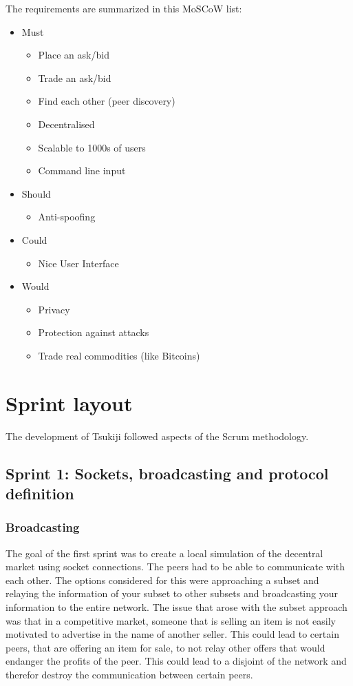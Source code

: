 \documentclass[]{article}
\newenvironment{myitemize}
{ \begin{itemize}
    \setlength{\itemsep}{0pt}
    \setlength{\parskip}{0pt}
    \setlength{\parsep}{0pt}     }
{ \end{itemize}                  }
\begin{document}
The requirements are summarized in this MoSCoW list: \\

\begin{myitemize}
\item Must
\begin{myitemize}
	\item Place an ask/bid
	\item Trade an ask/bid
    \item Find each other (peer discovery)
    \item Decentralised
    \item Scalable to 1000s of users
    \item Command line input
\end{myitemize}
\item Should
\begin{myitemize}
	\item Anti-spoofing
\end{myitemize}
\item Could
\begin{myitemize}
	\item Nice User Interface
\end{myitemize}
\item Would
\begin{myitemize}
	\item Privacy
	\item Protection against attacks
	\item Trade real commodities (like Bitcoins)
\end{myitemize}
\end{myitemize}

\section{Sprint layout}
The development of Tsukiji followed aspects of the Scrum methodology.

\subsection{Sprint 1: Sockets, broadcasting and protocol definition}
\subsubsection{Broadcasting}
The goal of the first sprint was to create a local simulation of the decentral market using socket connections.
The peers had to be able to communicate with each other.
The options considered for this were approaching a subset and relaying the information of your subset to other subsets and broadcasting your information to the entire network.
The issue that arose with the subset approach was that in a competitive market, someone that is selling an item is not easily motivated to advertise in the name of another seller.
This could lead to certain peers, that are offering an item for sale, to not relay other offers that would endanger the profits of the peer.
This could lead to a disjoint of the network and therefor destroy the communication between certain peers.
\end{document}

